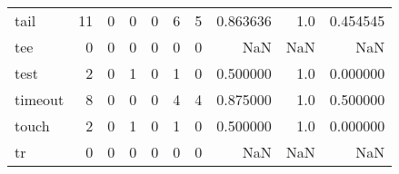 \begin{longtable}{lrrrrrrrrr}
tail      &                                      11 &                                                  0 &                                                  0 &                                                  0 &                                                  6 &                                                  5 &                                           0.863636 &                                    1.0 &                             0.454545 \\
tee       &                                       0 &                                                  0 &                                                  0 &                                                  0 &                                                  0 &                                                  0 &                                                NaN &                                    NaN &                                  NaN \\
test      &                                       2 &                                                  0 &                                                  1 &                                                  0 &                                                  1 &                                                  0 &                                           0.500000 &                                    1.0 &                             0.000000 \\
timeout   &                                       8 &                                                  0 &                                                  0 &                                                  0 &                                                  4 &                                                  4 &                                           0.875000 &                                    1.0 &                             0.500000 \\
touch     &                                       2 &                                                  0 &                                                  1 &                                                  0 &                                                  1 &                                                  0 &                                           0.500000 &                                    1.0 &                             0.000000 \\
tr        &                                       0 &                                                  0 &                                                  0 &                                                  0 &                                                  0 &                                                  0 &                                                NaN &                                    NaN &                                  NaN \\

\end{longtable}
